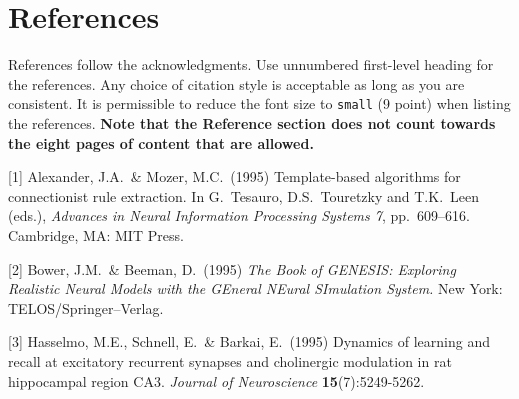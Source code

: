 \documentclass{article}
\theoremstyle{definition}
\begin{document}
\section*{References}

References follow the acknowledgments. Use unnumbered first-level heading for
the references. Any choice of citation style is acceptable as long as you are
consistent. It is permissible to reduce the font size to \verb+small+ (9 point)
when listing the references.
{\bf Note that the Reference section does not count towards the eight pages of content that are allowed.}
\medskip

\small

[1] Alexander, J.A.\ \& Mozer, M.C.\ (1995) Template-based algorithms for
connectionist rule extraction. In G.\ Tesauro, D.S.\ Touretzky and T.K.\ Leen
(eds.), {\it Advances in Neural Information Processing Systems 7},
pp.\ 609--616. Cambridge, MA: MIT Press.

[2] Bower, J.M.\ \& Beeman, D.\ (1995) {\it The Book of GENESIS: Exploring
  Realistic Neural Models with the GEneral NEural SImulation System.}  New York:
TELOS/Springer--Verlag.

[3] Hasselmo, M.E., Schnell, E.\ \& Barkai, E.\ (1995) Dynamics of learning and
recall at excitatory recurrent synapses and cholinergic modulation in rat
hippocampal region CA3. {\it Journal of Neuroscience} {\bf 15}(7):5249-5262.
\end{document}
